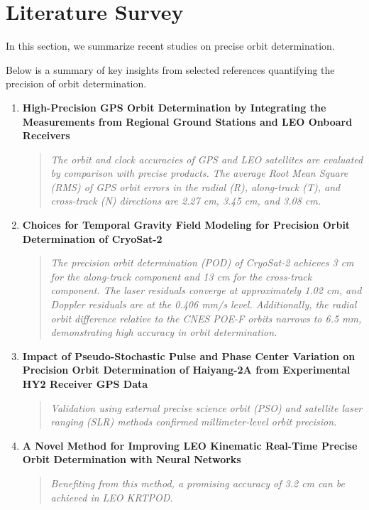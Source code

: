 \section{Literature Survey}
In this section, we summarize recent studies on precise orbit determination.

\noindent Below is a summary of key insights from selected references quantifying the precision of orbit determination.

\begin{enumerate}[label=\textbf{\arabic{enumi}.}, leftmargin=0.5in]

\item \textbf{High-Precision GPS Orbit Determination by Integrating the Measurements from Regional Ground Stations and LEO Onboard Receivers} \cite{li2024high}
\begin{quote}
    \textit{The orbit and clock accuracies of GPS and LEO satellites are evaluated by comparison with precise products. The average Root Mean Square (RMS) of GPS orbit errors in the radial (R), along-track (T), and cross-track (N) directions are 2.27 cm, 3.45 cm, and 3.08 cm.}
\end{quote}

\item \textbf{Choices for Temporal Gravity Field Modeling for Precision Orbit Determination of CryoSat-2} \cite{schrama2024choices}
\begin{quote}
    \textit{The precision orbit determination (POD) of CryoSat-2 achieves 3 cm for the along-track component and 13 cm for the cross-track component. The laser residuals converge at approximately 1.02 cm, and Doppler residuals are at the 0.406 mm/s level. Additionally, the radial orbit difference relative to the CNES POE-F orbits narrows to 6.5 mm, demonstrating high accuracy in orbit determination.}
\end{quote}

\item \textbf{Impact of Pseudo-Stochastic Pulse and Phase Center Variation on Precision Orbit Determination of Haiyang-2A from Experimental HY2 Receiver GPS Data} \cite{wang2024impact} 
\begin{quote} 
	\textit{Validation using external precise science orbit (PSO) and satellite laser ranging (SLR) methods confirmed millimeter-level orbit precision.} 
\end{quote}

\item \textbf{A Novel Method for Improving LEO Kinematic Real-Time Precise Orbit Determination with Neural Networks} \cite{zhang2024novel}
\begin{quote}
    \textit{Benefiting from this method, a promising accuracy of 3.2 cm can be achieved in LEO KRTPOD.}
\end{quote}


\end{enumerate}
